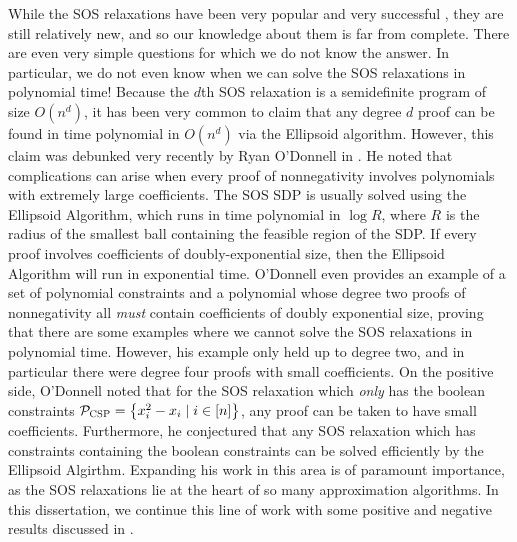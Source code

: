 While the SOS relaxations have been very popular and very successful , they are still relatively new, and so our knowledge about them is far from complete.
There are even very simple questions for which we do not know the answer.
In particular, we do not even know when we can solve the SOS relaxations in polynomial time!
Because the $d$th SOS relaxation is a semidefinite program of size $O(n^d)$, it has been very common to claim that any degree $d$ proof can be found in time polynomial in $O(n^d)$ via the Ellipsoid algorithm. However, this claim was debunked very recently by Ryan O'Donnell in \cite{ODon16}.
He noted that complications can arise when every proof of nonnegativity involves polynomials with extremely large coefficients.
The SOS SDP is usually solved using the Ellipsoid Algorithm, which runs in time polynomial in $\log R$, where $R$ is the radius of the smallest ball containing the feasible region of the SDP.
If every proof involves coefficients of doubly-exponential size, then the Ellipsoid Algorithm will run in exponential time.
O'Donnell even provides an example of a set of polynomial constraints and a polynomial whose degree two proofs of nonnegativity all \emph{must} contain coefficients of doubly exponential size, proving that there are some examples where we cannot solve the SOS relaxations in polynomial time.
However, his example only held up to degree two, and in particular there were degree four proofs with small coefficients.
On the positive side, O'Donnell noted that for the SOS relaxation which \emph{only} has the boolean constraints $\mathcal P_{\textsc{CSP}} = \left\{x_i^2 - x_i \mid i \in [n]\right\}$, any proof can be taken to have small coefficients.
Furthermore, he conjectured that any SOS relaxation which has constraints containing the boolean constraints can be solved efficiently by the Ellipsoid Algirthm.
Expanding his work in this area is of paramount importance, as the SOS relaxations lie at the heart of so many approximation algorithms.
In this dissertation, we continue this line of work with some positive and negative results discussed in .


